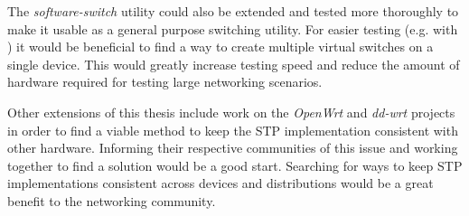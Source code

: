 The \textit{software-switch} utility could also be extended and tested more thoroughly to make it usable as a general purpose switching utility.
For easier testing (e.g. with \tool) it would be beneficial to find a way to create multiple virtual switches on a single device.
This would greatly increase testing speed and reduce the amount of hardware required for testing large networking scenarios. 

Other extensions of this thesis include work on the \textit{OpenWrt} and \textit{dd-wrt} projects in order to find a viable method to keep the STP implementation consistent with other hardware.
Informing their respective communities of this issue and working together to find a solution would be a good start.
Searching for ways to keep STP implementations consistent across devices and distributions would be a great benefit to the networking community.
